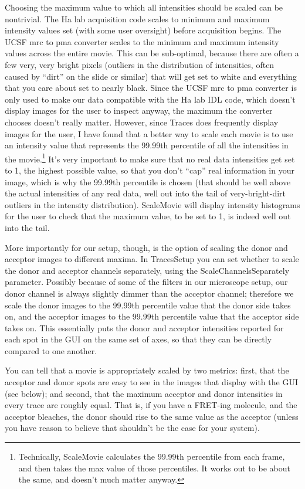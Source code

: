 \documentclass[11pt]{article}
\begin{document}
Choosing the maximum value to which all intensities should be scaled can be nontrivial. The Ha lab acquisition code scales to minimum and maximum intensity values set (with some user oversight) before acquisition begins.  The UCSF mrc to pma converter scales to the minimum and maximum intensity values across the entire movie.  This can be  sub-optimal, because there are often a few very, very bright pixels (outliers in the distribution of intensities, often caused by ``dirt'' on the slide or similar) that will get set to white and everything that you care about set to nearly black.  Since the UCSF mrc to pma converter is only used to make our data compatible with the Ha lab IDL code, which doesn't display images for the user to inspect anyway, the maximum the converter chooses doesn't really matter.  However, since Traces does frequently display images for the user, I have found that a better way to scale each movie is to use an intensity value that represents the 99.99th percentile of all the intensities in the movie.\footnote{Technically, ScaleMovie calculates the 99.99th percentile from each frame, and then takes the max value of those percentiles.  It works out to be about the same, and doesn't much matter anyway.}  It's very important to make sure that no real data intensities get set to 1, the highest possible value, so that you don't ``cap'' real information in your image, which is why the 99.99th percentile is chosen (that should be well above the actual intensities of any real data, well out into the tail of very-bright-dirt outliers in the intensity distribution). ScaleMovie will display intensity histograms for the user to check that the maximum value, to be set to 1, is indeed well out into the tail.

More importantly for our setup, though, is the option of scaling the donor and acceptor images to different maxima.  In TracesSetup you can set whether to scale the donor and acceptor channels separately, using the ScaleChannelsSeparately parameter.  Possibly because of some of the filters in our microscope setup, our donor channel is always slightly dimmer than the acceptor channel; therefore we scale the donor images to the 99.99th percentile value that the donor side takes on, and the acceptor images to the 99.99th percentile value that the acceptor side takes on.  This essentially puts the donor and acceptor intensities reported for each spot in the GUI on the same set of axes, so that they can be directly compared to one another.  

You can tell that a movie is appropriately scaled by two metrics: first, that the acceptor and donor spots are easy to see in the images that display with the GUI (see below); and second, that the maximum acceptor and donor intensities in every trace are roughly equal.  That is, if you have a FRET-ing molecule, and the acceptor bleaches, the donor should rise to the same value as the acceptor (unless you have reason to believe that shouldn't be the case for your system).
\end{document}
